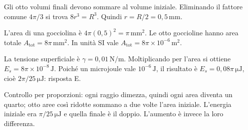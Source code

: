 \documentclass[11pt,a4paper]{article}
\begin{document}
\begin{samepage}
Gli otto volumi finali devono sommare al volume iniziale. Eliminando il fattore comune \(4\pi/3\) si trova \(8r^3=R^3\). Quindi \(r=R/2=0{,}5\,\mathrm{mm}\).\par

L’area di una gocciolina è \(4\pi(0{,}5)^2=\pi\,\mathrm{mm^2}\). Le otto goccioline hanno area totale \(A_{\mathrm{tot}}=8\pi\,\mathrm{mm^2}\). In unità SI vale \(A_{\mathrm{tot}}=8\pi\times10^{-6}\,\mathrm{m^2}\).\par

La tensione superficiale è \(\gamma=0{,}01\,\mathrm{N/m}\). Moltiplicando per l’area si ottiene \(E_s=8\pi\times10^{-8}\,\mathrm{J}\). Poiché un microjoule vale \(10^{-6}\,\mathrm{J}\), il risultato è \(E_s=0{,}08\pi\,\mathrm{\mu J}\), cioè \(2\pi/25\,\mathrm{\mu J}\): risposta E.\par

Controllo per proporzioni: ogni raggio dimezza, quindi ogni area diventa un quarto; otto aree così ridotte sommano a due volte l’area iniziale. L’energia iniziale era \(\pi/25\,\mathrm{\mu J}\) e quella finale è il doppio. L’aumento è invece la loro differenza.\par

\end{samepage}
\newpage
\end{document}
